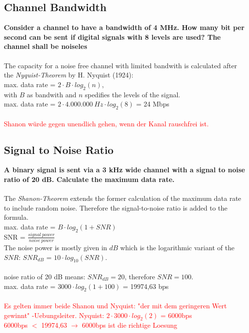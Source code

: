 \documentclass[a4paper,12pt]{article}
\begin{document}
	
\subsection{Channel Bandwidth}
\textbf{Consider a channel to have a bandwidth of 4 MHz. How many bit per second can be sent if digital signals with 8 levels are used? The channel shall be noiseles}\\
\\
The capacity for a noise free channel with limited bandwith is calculated after the \textit{Nyquist-Theorem} by H. Nyquist (1924):\\
max. data rate = $2 \cdot B \cdot log_{2}(n)$,\\
with $B$ as bandwith and $n$ spedifies the levels of the signal.
\\
max. data rate = $2 \cdot 4.000.000~Hz \cdot log_{2}(8)$ = 24 Mbps\\
\\
\textcolor{red}{Shanon würde gegen unendlich gehen, wenn der Kanal rauschfrei ist.}
	
\subsection{Signal to Noise Ratio}
\textbf{A binary signal is sent via a 3 kHz wide channel with a signal to noise ratio of 20 dB. Calculate the maximum data rate.}\\
\\
The \textit{Shanon-Theorem} extends the former calculation of the maximum data rate to include random noise. Therefore the signal-to-noise ratio is added to the formula.\\
max. data rate = $B \cdot log_{2}(1 + SNR)$\\
SNR = $\frac{signal~power}{noise~power}$\\
The noise power is mostly given in $dB$ which is the logarithmic variant of the $SNR$: $SNR_{dB}$ = $10 \cdot log_{10}(SNR)$.\\
\\
noise ratio of 20 dB means: $SNR_{dB} = 20$, therefore $SNR = 100$.\\
max. data rate = $3000 \cdot log_{2}(1 +100)$ = 19974,63 bps\\
\\
\textcolor{red}{Es gelten immer beide Shanon und Nyquist: "der mit dem geringeren Wert gewinnt" -Uebungsleiter.
	Nyquist: $2 \cdot 3000 \cdot log_{2}(2)$ = 6000bps\\
	6000bps $<$ 19974,63 $\rightarrow$ 6000bps ist die richtige Loesung}
\end{document}

